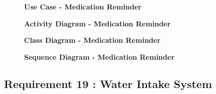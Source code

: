 \documentclass{article}
\begin{document}
\clearpage

\begin{figure}[htbp]
	\textbf{Use Case - Medication Reminder}
	\centering
	\begin{subfigure}{\textwidth}
		\resizebox{\textwidth}{!}{}
	\end{subfigure}
	\begin{subfigure}{\textwidth}
	\end{subfigure}
\end{figure}

\clearpage


\begin{figure}[htbp]
	\textbf{Activity Diagram - Medication Reminder }
	\centering
	\begin{subfigure}{\textwidth}
		\resizebox{\textwidth}{!}{}
	\end{subfigure}
	\begin{subfigure}{\textwidth}
	\end{subfigure}
\end{figure}

\clearpage

\begin{figure}[htbp]
	\textbf{Class Diagram - Medication Reminder}
	\centering
	\begin{subfigure}{\textwidth}
		\resizebox{\textwidth}{!}{}
	\end{subfigure}
	\begin{subfigure}{\textwidth}
	\end{subfigure}
\end{figure}

\clearpage

\begin{figure}[htbp]
	\textbf{Sequence Diagram - Medication Reminder}
	\centering
	\begin{subfigure}{\textwidth}
		\resizebox{\textwidth}{!}{}
	\end{subfigure}
	\begin{subfigure}{\textwidth}
	\end{subfigure}
\end{figure}

\clearpage


\subsection{Requirement 19 : Water Intake System}
\end{document}
